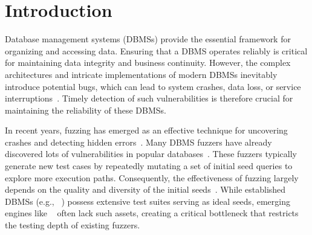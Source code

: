 \documentclass[sigconf,review,anonymous]{acmart}
\begin{document}

\maketitle
\section{Introduction}

Database management systems (DBMSs) provide the essential framework for organizing and accessing data.
Ensuring that a DBMS operates reliably is critical for maintaining data integrity and business continuity.
However, the complex architectures and intricate implementations of modern DBMSs inevitably introduce potential bugs, which can lead to system crashes, data loss, or service interruptions~\cite{pgbugs, mysqlbugs}.
Timely detection of such vulnerabilities is therefore crucial for maintaining the reliability of these DBMSs.

In recent years, fuzzing has emerged as an effective technique for uncovering crashes and detecting hidden errors~\cite{afl, libfuzzer, aflpp, pafl}. 
Many DBMS fuzzers have already discovered lots of vulnerabilities in popular databases~\cite{sqlsmithbug, DBbugs, sqlsmith}. 
These fuzzers typically generate new test cases by repeatedly mutating a set of initial seed queries to explore more execution paths. Consequently, the effectiveness of fuzzing largely depends on the quality and diversity of the initial seeds~\cite{fu2022griffin, liang2023sequence, jiang2023dynsql, zhong2020squirrel}.
While established DBMSs (e.g., \pg{}~\cite{pg_git}) possess extensive test suites serving as ideal seeds, emerging engines like \duckdb{}~\cite{duckdb_git} often lack such assets, creating a critical bottleneck that restricts the testing depth of existing fuzzers.


\end{document}
